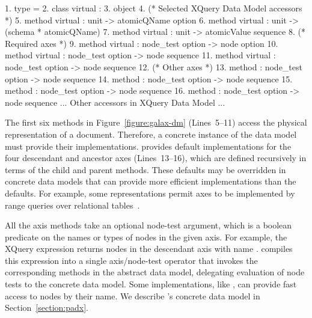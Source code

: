 \begin{figure*}
\begin{small}
\begin{code}
{ 1}. type  = 
{ 2}. class virtual  : 
{ 3}. object
{ 4}.   (* Selected XQuery Data Model accessors *)
{ 5}.   method virtual    : unit -> atomicQName option
{ 6}.   method virtual         : unit -> (schema * atomicQName)
{ 7}.   method virtual  : unit -> atomicValue sequence
\mbox{}
{ 8}.   (* Required axes *)
{ 9}.   method virtual       : node_test option -> node option
{10}.   method virtual        : node_test option -> node sequence
{11}.   method virtual    : node_test option -> node sequence
\mbox{}
{12}.   (* Other axes *)
{13}.   method   : node_test option -> node sequence
{14}.   method           : node_test option -> node sequence
{15}.   method     : node_test option -> node sequence
{16}.   method             : node_test option -> node sequence
\mbox{}
  ... Other accessors in XQuery Data Model ...
\end{code}
\end{small}
\caption{Signatures for methods in Galax's abstract node interface}
\label{figure:galax-dm}
\end{figure*}

The first six methods in Figure~\ref{figure:galax-dm} (Lines~5--11) access the
physical representation of a document. Therefore, a concrete instance
of the data model must provide their implementations.  \Galax{}
provides default implementations for the four {descendant} and
ancestor axes (Lines~13--16), which are defined recursively in terms of the {child}
and {parent} methods.  These defaults may be overridden in concrete data
models that can provide more efficient implementations than the
defaults.  For example, some representations permit
axes to be implemented by range queries over relational
tables~\cite{grust03staircase}.

All the axis methods take an optional node-test argument, which is a
boolean predicate on the names or types of nodes in the given axis.
For example, the XQuery expression  returns
nodes in the descendant axis with name .  \Galax{} compiles
this expression into a single axis/node-test operator that invokes the
corresponding methods in the abstract data model, delegating
evaluation of node tests to the concrete data model.  Some
implementations, like \padx{}, can provide fast access to nodes by
their name.  We describe \padx{}'s concrete data model in Section~\ref{section:padx}.

